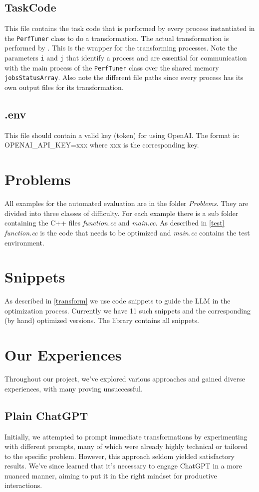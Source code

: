 \documentclass[twocolumn]{article}
\begin{document}
\subsection{TaskCode}
This file contains the task code that is performed by every process instantiated in the \texttt{PerfTuner} class to do a transformation. The actual transformation is performed by \texttt{}. This is the wrapper for the transforming processes. Note the parameters \texttt{i} and \texttt{j} that identify a process and are essential for communication with the main process of the \texttt{PerfTuner} class over the shared memory \texttt{jobsStatusArray}. Also note the different file paths since every process has its own output files for its transformation.

\subsection{.env}
This file should contain a valid key (token) for using OpenAI. The format is: OPENAI\_API\_KEY=xxx where xxx is the corresponding key.

\section{Problems} \label{problems}
All examples for the automated evaluation are in the folder \textit{Problems}. They are divided into three classes of difficulty. For each example there is a sub folder containing the C++ files \textit{function.cc} and \textit{main.cc}. As described in \ref{test} \textit{function.cc} is the code that needs to be optimized and \textit{main.cc} contains the test environment. 

\section{Snippets} \label{snippets}
As described in \ref{transform} we use code snippets to guide the LLM in the optimization process. Currently we have 11 such snippets and the corresponding (by hand) optimized versions. The library contains all snippets. 

\section{Our Experiences} \label{experiences}
Throughout our project, we've explored various approaches and gained diverse experiences, with many proving unsuccessful.

\subsection{Plain ChatGPT}
Initially, we attempted to prompt immediate transformations by experimenting with different prompts, many of which were already highly technical or tailored to the specific problem. However, this approach seldom yielded satisfactory results. We've since learned that it's necessary to engage ChatGPT in a more nuanced manner, aiming to put it in the right mindset for productive interactions.
\end{document}
